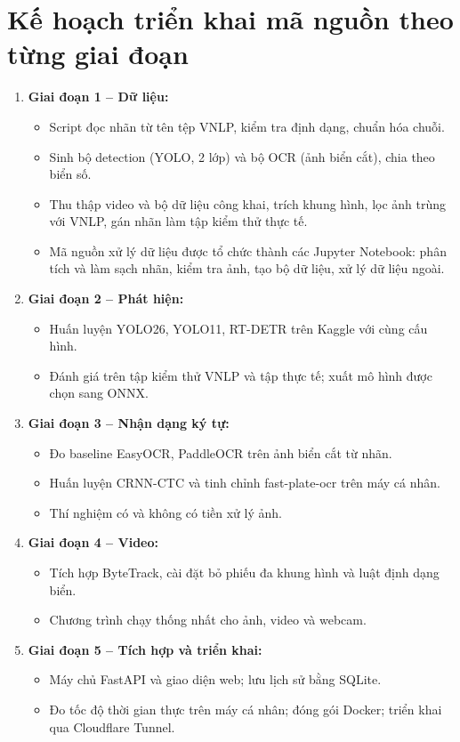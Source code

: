 \section{Kế hoạch triển khai mã nguồn theo từng giai đoạn}

\begin{enumerate}
  \item \textbf{Giai đoạn 1 -- Dữ liệu:}
  \begin{itemize}
    \item Script đọc nhãn từ tên tệp VNLP, kiểm tra định dạng, chuẩn hóa chuỗi.
    \item Sinh bộ detection (YOLO, 2 lớp) và bộ OCR (ảnh biển cắt), chia theo biển số.
    \item Thu thập video và bộ dữ liệu công khai, trích khung hình, lọc ảnh trùng với VNLP, gán nhãn làm tập kiểm thử thực tế.
    \item Mã nguồn xử lý dữ liệu được tổ chức thành các Jupyter Notebook: phân tích và làm sạch nhãn, kiểm tra ảnh, tạo bộ dữ liệu, xử lý dữ liệu ngoài.
  \end{itemize}

  \item \textbf{Giai đoạn 2 -- Phát hiện:}
  \begin{itemize}
    \item Huấn luyện YOLO26, YOLO11, RT-DETR trên Kaggle với cùng cấu hình.
    \item Đánh giá trên tập kiểm thử VNLP và tập thực tế; xuất mô hình được chọn sang ONNX.
  \end{itemize}

  \item \textbf{Giai đoạn 3 -- Nhận dạng ký tự:}
  \begin{itemize}
    \item Đo baseline EasyOCR, PaddleOCR trên ảnh biển cắt từ nhãn.
    \item Huấn luyện CRNN-CTC và tinh chỉnh fast-plate-ocr trên máy cá nhân.
    \item Thí nghiệm có và không có tiền xử lý ảnh.
  \end{itemize}

  \item \textbf{Giai đoạn 4 -- Video:}
  \begin{itemize}
    \item Tích hợp ByteTrack, cài đặt bỏ phiếu đa khung hình và luật định dạng biển.
    \item Chương trình chạy thống nhất cho ảnh, video và webcam.
  \end{itemize}

  \item \textbf{Giai đoạn 5 -- Tích hợp và triển khai:}
  \begin{itemize}
    \item Máy chủ FastAPI và giao diện web; lưu lịch sử bằng SQLite.
    \item Đo tốc độ thời gian thực trên máy cá nhân; đóng gói Docker; triển khai qua Cloudflare Tunnel.
  \end{itemize}
\end{enumerate}

